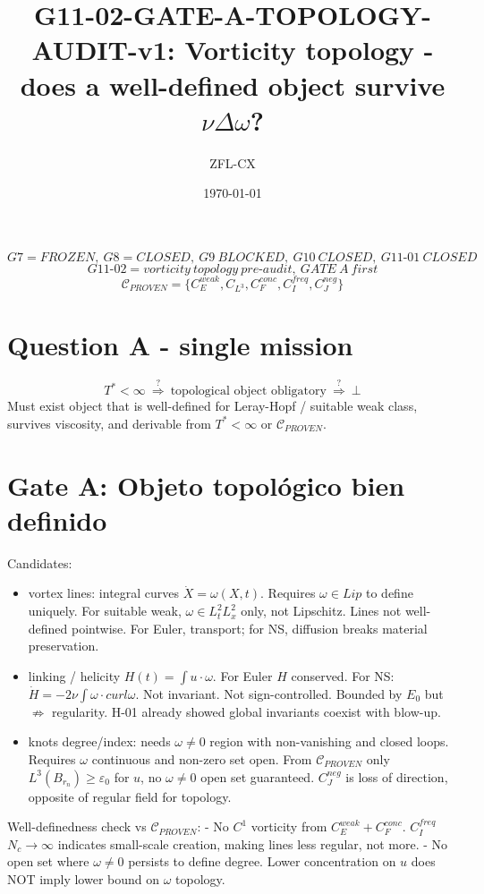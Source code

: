 \documentclass[11pt]{article}
\begin{document}
\title{G11-02-GATE-A-TOPOLOGY-AUDIT-v1: Vorticity topology - does a well-defined object survive $\nu\Delta\omega$?}
\author{ZFL-CX}\date{\today}\maketitle

\[
\boxed{G7=FROZEN,\ G8=CLOSED,\ G9\ BLOCKED,\ G10\ CLOSED,\ G11\text{-}01\ CLOSED}
\]
\[
\boxed{G11\text{-}02 = vorticity\ topology\ pre\text{-}audit,\ GATE\ A\ first}
\]
\[
\boxed{\mathcal C_{PROVEN}=\{C_E^{weak},C_{L^3},C_F^{conc},C_I^{freq},C_J^{neg}\}}
\]

\section{Question A - single mission}
\[
\boxed{T^*<\infty\ \overset{?}{\Longrightarrow}\ \text{topological object obligatory}\ \overset{?}{\Longrightarrow}\ \bot}
\]
Must exist object that is well-defined for Leray-Hopf / suitable weak class, survives viscosity, and derivable from $T^*<\infty$ or $\mathcal C_{PROVEN}$.

\section{Gate A: Objeto topológico bien definido}

Candidates:
\begin{itemize}
\item vortex lines: integral curves $\dot X = \omega(X,t)$. Requires $\omega\in Lip$ to define uniquely. For suitable weak, $\omega\in L^2_tL^2_x$ only, not Lipschitz. Lines not well-defined pointwise. For Euler, transport; for NS, diffusion breaks material preservation.
\item linking / helicity $H(t)=\int u\cdot\omega$. For Euler $H$ conserved. For NS: $\dot H=-2\nu\int\omega\cdot curl\omega$. Not invariant. Not sign-controlled. Bounded by $E_0$ but $\not\Rightarrow$ regularity. H-01 already showed global invariants coexist with blow-up.
\item knots degree/index: needs $ \omega\neq0$ region with non-vanishing and closed loops. Requires $\omega$ continuous and non-zero set open. From $\mathcal C_{PROVEN}$ only $L^3(B_{r_n})\ge\varepsilon_0$ for $u$, no $\omega\neq0$ open set guaranteed. $C_J^{neg}$ is loss of direction, opposite of regular field for topology.
\end{itemize}

Well-definedness check vs $\mathcal C_{PROVEN}$:
- No $C^1$ vorticity from $C_E^{weak}+C_F^{conc}$. $C_I^{freq}$ $N_c\to\infty$ indicates small-scale creation, making lines less regular, not more.
- No open set where $\omega\neq0$ persists to define degree. Lower concentration on $u$ does NOT imply lower bound on $\omega$ topology.
\end{document}
